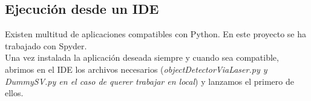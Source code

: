 \subsection{Ejecución desde un IDE}
Existen multitud de aplicaciones compatibles con Python. En este proyecto se ha trabajado con Spyder.\\
Una vez instalada la aplicación deseada siempre y cuando sea compatible, abrimos en el IDE los archivos necesarios (\textit{objectDetectorViaLaser.py y DummySV.py en el caso de querer trabajar en local}) y lanzamos el primero de ellos.\\


